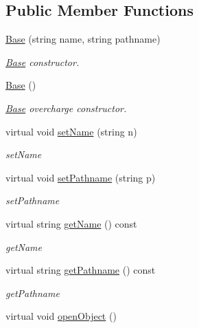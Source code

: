 \subsection*{Public Member Functions}
\begin{DoxyCompactItemize}
\item 
\hyperlink{classBase_aa44896f1e8d46be11fe7698a9a6947e0}{Base} (string name, string pathname)
\begin{DoxyCompactList}\small\item\em \hyperlink{classBase}{Base} constructor. \end{DoxyCompactList}\item 
\hypertarget{classBase_a5ffe0568374d8b9b4c4ec32953fd6453}{\hyperlink{classBase_a5ffe0568374d8b9b4c4ec32953fd6453}{Base} ()}\label{classBase_a5ffe0568374d8b9b4c4ec32953fd6453}

\begin{DoxyCompactList}\small\item\em \hyperlink{classBase}{Base} overcharge constructor. \end{DoxyCompactList}\item 
virtual void \hyperlink{classBase_accfd86f100d4232debfc745b2b244dbd}{set\-Name} (string n)
\begin{DoxyCompactList}\small\item\em set\-Name \end{DoxyCompactList}\item 
virtual void \hyperlink{classBase_a257547bb1e92fe64fb01863d82c5db5d}{set\-Pathname} (string p)
\begin{DoxyCompactList}\small\item\em set\-Pathname \end{DoxyCompactList}\item 
virtual string \hyperlink{classBase_a7608d0f3a0d939fdf1068883cd9f02cd}{get\-Name} () const 
\begin{DoxyCompactList}\small\item\em get\-Name \end{DoxyCompactList}\item 
virtual string \hyperlink{classBase_a5987267cc60429ed6a65bd1e4ffa43ab}{get\-Pathname} () const 
\begin{DoxyCompactList}\small\item\em get\-Pathname \end{DoxyCompactList}\item 
\hypertarget{classBase_a117954a5c2b7e6c040cbea5a98d81795}{virtual void \hyperlink{classBase_a117954a5c2b7e6c040cbea5a98d81795}{open\-Object} ()}\label{classBase_a117954a5c2b7e6c040cbea5a98d81795}


\end{DoxyCompactItemize}

